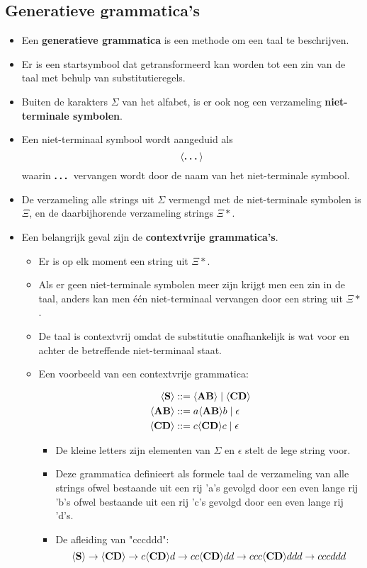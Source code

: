 \subsection{Generatieve grammatica's}
\begin{itemize}
    \item Een \textbf{generatieve grammatica} is een methode om een taal te beschrijven.
    \item Er is een startsymbool dat getransformeerd kan worden tot een zin van de taal met behulp van substitutieregels.
    \item Buiten de karakters $\Sigma$ van het alfabet, is er ook nog een verzameling \textbf{niet-terminale symbolen}.
    \item Een niet-terminaal symbool wordt aangeduid als
        $$\langle \textbf{\dots} \rangle$$
        waarin $\textbf{\dots}$ vervangen wordt door de naam van het niet-terminale symbool. 
    \item De verzameling alle strings uit $\Sigma$ vermengd met de niet-terminale symbolen is $\Xi$, en de daarbijhorende verzameling strings $\Xi*$.
    \item Een belangrijk geval zijn de \textbf{contextvrije grammatica's}.
    \begin{itemize}
        \item Er is op elk moment een string uit $\Xi*$.
        \item Als er geen niet-terminale symbolen meer zijn krijgt men een zin in de taal, anders kan men één niet-terminaal vervangen door een string uit $\Xi*$.
        \item De taal is contextvrij omdat de substitutie onafhankelijk is wat voor en achter de betreffende niet-terminaal staat.
        \item Een voorbeeld van een contextvrije grammatica:

        \begin{align*}
             \langle \textbf{S} \rangle &::= \langle \textbf{AB} \rangle\;|\;\langle \textbf{CD} \rangle \\
             \langle \textbf{AB} \rangle &::= a\langle \textbf{AB} \rangle b\;|\;\epsilon \\
             \langle \textbf{CD} \rangle &::= c\langle \textbf{CD} \rangle c\;|\;\epsilon
        \end{align*}
        \begin{itemize}
            \item De kleine letters zijn elementen van $\Sigma$ en $\epsilon$ stelt de lege string voor.
            \item Deze grammatica definieert als formele taal de verzameling van alle strings ofwel bestaande uit een rij 'a's gevolgd door een even lange rij 'b's ofwel bestaande uit een rij 'c's gevolgd door een even lange rij 'd's.    
            \item De afleiding van "cccddd":
            $$\langle \textbf{S} \rangle \rightarrow \langle \textbf{CD} \rangle \rightarrow c\langle \textbf{CD} \rangle d \rightarrow cc\langle \textbf{CD} \rangle dd \rightarrow ccc\langle \textbf{CD} \rangle ddd \rightarrow cccddd$$
        \end{itemize}
    \end{itemize}
\end{itemize}

